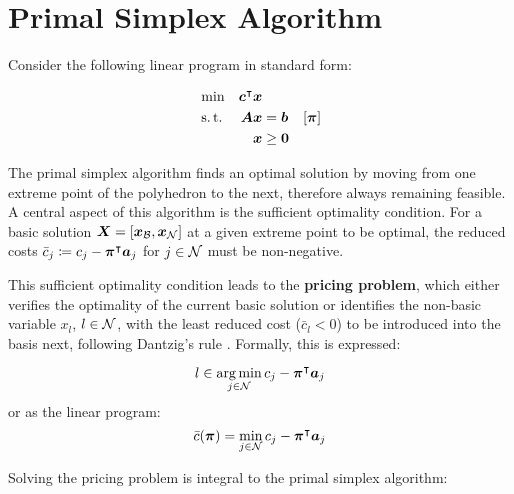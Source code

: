 \section{Primal Simplex Algorithm}\label{sec:preliminaries_psa}
Consider the following linear program in standard form:

\begin{equation}\label{eq:lp_standard}
\begin{aligned}
&\min & {\bm{c}}^\intercal {\bm{x}} & & \\
&\operatorname{s.t.} & {\bm{A}} {\bm{x}} & = {\bm{b}} & \left[{\bm{\pi}}\right] \\
&& {\bm{x}} & \geq {\bm{0}} &
\end{aligned}
\end{equation}

The primal simplex algorithm \cite{dantzig1997simplex} finds an optimal solution by moving from one extreme point of the polyhedron to the next, therefore always remaining feasible. A central aspect of this algorithm is the sufficient optimality condition. For a basic solution ${\bm{X}} = \left[{\bm{x}}_{\mathcal{B}}, {\bm{x}}_{\mathcal{N}}\right]$ at a given extreme point to be optimal, the reduced costs $\bar{c}_j \coloneqq c_j - \vec{\pi}\transpose \vec{a}_j$ for $j \in \mathcal{N}$ must be non-negative.

This sufficient optimality condition leads to the \textbf{pricing problem}, which either verifies the optimality of the current basic solution or identifies the non-basic variable $x_l$, $l \in \mathcal{N}$, with the least reduced cost ($\bar{c}_l < 0$) to be introduced into the basis next, following Dantzig's rule \cite{dantzig1997simplex,ploskas2014pivoting,thebook}. Formally, this is expressed:

\begin{equation*}
l \in \underset{j \in \mathcal{N}}{\arg\min} \, c_j - {\bm{\pi}}^\intercal {\bm{a}}_j
\end{equation*}
or as the linear program:
\begin{equation}\label{eq:psa_pp}
\bar{c}(\vec{\pi}) = \underset{j \in \indexset{N}}{\min} \, c_j - \vec{\pi}\transpose \vec{a}_j
\end{equation}

Solving the pricing problem is integral to the primal simplex algorithm:

